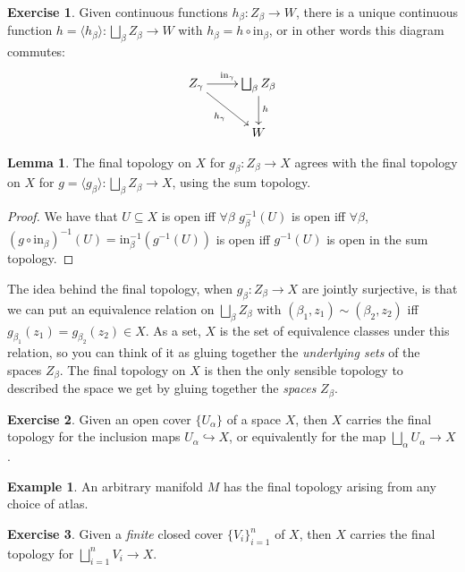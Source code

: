 \documentclass{tufte-handout}
\def\into {\hookrightarrow}
\theoremstyle{definition}
\newtheorem{lemma}{Lemma}
\newtheorem{example}{Example}
\newtheorem{ex}{Exercise}
\begin{document}
\begin{ex} 
Given continuous functions $h_\beta\colon Z_\beta \to W$, there is a unique continuous function $h = 
\langle h_\beta \rangle \colon \bigsqcup_\beta Z_\beta\to W$ with $h_\beta = h\circ 
\mathrm{in}_\beta$, or in other words this diagram commutes: 
\[
	\xymatrixnocompile{ 
		Z_\gamma \ar[r]^{\mathrm{in}_\gamma} \ar[dr]_{h_\gamma} & \bigsqcup_\beta 
		Z_\beta \ar[d]^h \\ & W
	}
\] 
\end{ex}

\begin{lemma} 
The final topology on $X$ for $g_\beta\colon Z_\beta \to X$ agrees with the 
final topology on $X$ for $g = \langle g_\beta \rangle\colon \bigsqcup_\beta Z_\beta \to X$, 
using the sum topology. 
\end{lemma}

\begin{proof} 
We have that $U\subseteq X$ is open iff $\forall \beta$ $g_\beta^{-1}(U)$ is 
open iff $\forall \beta$, $(g\circ \mathrm{in}_\beta)^{-1}(U) = 
\mathrm{in}_\beta^{-1}\left(g^{-1}(U)\right)$ is open iff $g^{-1}(U)$ is open in the sum 
topology. 
\end{proof}

The idea behind the final topology, when $g_\beta\colon Z_\beta \to X$ are jointly 
surjective, 
is that we can put an equivalence relation on $\bigsqcup_\beta Z_\beta$ 
with $(\beta_1,z_1)\sim (\beta_2,z_2)$ iff $g_{\beta_1}(z_1) = g_{\beta_2}(z_2)\in X$. As a 
set, $X$ is the set of equivalence classes under this relation, so you can think of it as 
gluing together the \emph{underlying sets} of the spaces $Z_\beta$. The final topology on $X$ is 
then the only sensible topology to described the space we get by gluing together the 
\emph{spaces} $Z_\beta$. 

\begin{ex}
Given an open cover $\{U_\alpha\}$ of a space $X$, then $X$ carries the final topology for 
the inclusion maps $U_\alpha \into X$, or equivalently for the map 
$\bigsqcup_\alpha U_\alpha\to X$.
\end{ex}

\begin{example}
An arbitrary manifold $M$ has the final topology arising from any choice of atlas.
\end{example}

\begin{ex}\label{ex:closed_cover_gluing_lemma}
Given a \emph{finite} closed cover $\{V_i\}_{i=1}^n$ of $X$, then $X$ carries the final 
topology for $\bigsqcup_{i=1}^n V_i \to X$.
\end{ex}
\end{document}
